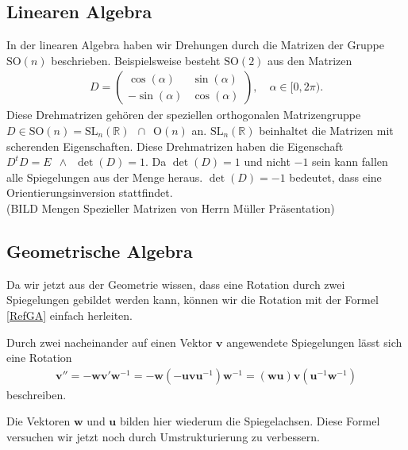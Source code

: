 \subsection{Linearen Algebra}
In der linearen Algebra haben wir Drehungen durch die Matrizen der Gruppe $\text{SO}(n)$ beschrieben. Beispielsweise besteht $\text{SO}(2)$  aus den Matrizen
\begin{align}
	D = 
	\begin{pmatrix}
		\cos(\alpha) & \sin(\alpha) \\
		-\sin(\alpha) & \cos(\alpha) 
	\end{pmatrix},\quad
	\alpha \in [0, 2\pi).
\end{align}
Diese Drehmatrizen gehören der speziellen orthogonalen Matrizengruppe $D\in \text{SO}(n) = \text{SL}_n(\mathbb{R})\enspace \cap \enspace \text{O}(n)$ an. $\text{SL}_n(\mathbb{R})$ beinhaltet die Matrizen mit scherenden Eigenschaften. Diese Drehmatrizen haben die Eigenschaft $D^t D = E \enspace \land \enspace \det(D)=1$. Da $\det(D) = 1$ und nicht $-1$ sein kann fallen alle Spiegelungen aus der Menge heraus. $\det(D) = -1$ bedeutet, dass eine Orientierungsinversion stattfindet.  
\\(BILD Mengen Spezieller Matrizen von Herrn Müller Präsentation)

\subsection{Geometrische Algebra}
Da wir jetzt aus der Geometrie wissen, dass eine Rotation durch zwei Spiegelungen gebildet werden kann, können wir die Rotation mit der Formel \eqref{RefGA} einfach herleiten.
\begin{satz}
	Durch zwei nacheinander auf einen Vektor $\mathbf{v}$ angewendete Spiegelungen lässt sich eine Rotation 
	\begin{align} \label{rotGA}
		\mathbf{v}'' = -\mathbf{wv}'\mathbf{w}^{-1} = -\mathbf{w}(-\mathbf{uvu}^{-1})\mathbf{w}^{-1} = (\mathbf{wu})\mathbf{v}(\mathbf{u}^{-1}\mathbf{w}^{-1})
	\end{align}
	beschreiben.
\end{satz}
Die Vektoren $\mathbf{w}$ und $\mathbf{u}$ bilden hier wiederum die Spiegelachsen. Diese Formel versuchen wir jetzt noch durch Umstrukturierung zu verbessern. 
